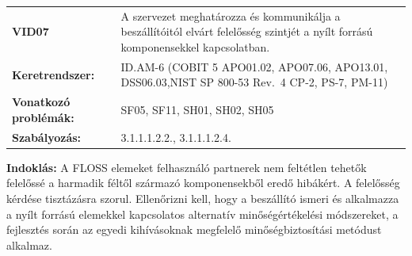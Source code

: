 \documentclass[12pt,magyar,a4paper,oneside]{scrreprt}
\begin{document}
\begin{longtable}[]{@{}ll@{}}
\toprule
\endhead
\begin{minipage}[t]{0.16\columnwidth}\raggedright
\textbf{VID07}\strut
\end{minipage} & \begin{minipage}[t]{0.79\columnwidth}\raggedright
A szervezet meghatározza és kommunikálja a beszállítóitól elvárt
felelősség szintjét a nyílt forrású komponensekkel kapcsolatban.\strut
\end{minipage}\tabularnewline
\begin{minipage}[t]{0.16\columnwidth}\raggedright
\textbf{Keretrendszer:}\strut
\end{minipage} & \begin{minipage}[t]{0.79\columnwidth}\raggedright
ID.AM-6 (COBIT 5 APO01.02, APO07.06, APO13.01, DSS06.03,NIST SP 800-53
Rev.~4 CP-2, PS-7, PM-11)\strut
\end{minipage}\tabularnewline
\begin{minipage}[t]{0.16\columnwidth}\raggedright
\textbf{Vonatkozó problémák:}\strut
\end{minipage} & \begin{minipage}[t]{0.79\columnwidth}\raggedright
SF05, SF11, SH01, SH02, SH05\strut
\end{minipage}\tabularnewline
\begin{minipage}[t]{0.16\columnwidth}\raggedright
\textbf{Szabályozás:}\strut
\end{minipage} & \begin{minipage}[t]{0.79\columnwidth}\raggedright
3.1.1.1.2.2., 3.1.1.1.2.4.\strut
\end{minipage}\tabularnewline
\bottomrule
\end{longtable}

\textbf{Indoklás: } A FLOSS elemeket felhasználó partnerek nem feltétlen
tehetők felelőssé a harmadik féltől származó komponensekből eredő
hibákért. A felelősség kérdése tisztázásra szorul. Ellenőrizni kell,
hogy a beszállító ismeri és alkalmazza a nyílt forrású elemekkel
kapcsolatos alternatív minőségértékelési módszereket, a fejlesztés során
az egyedi kihívásoknak megfelelő minőségbiztosítási metódust alkalmaz.
\end{document}
